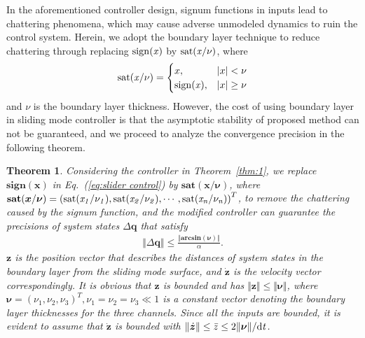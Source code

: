 \documentclass[3p]{elsarticle}
\theoremstyle{plain}
\newtheorem{mythm}{Theorem}
\theoremstyle{remark}
\begin{document}
In the aforementioned controller design, signum functions in inputs lead to chattering phenomena, which may cause adverse unmodeled dynamics to ruin the control system. Herein, we adopt the boundary layer technique to reduce chattering through replacing $\rm{sign}\it{(x)}$ by $\rm{sat}\it{(x/\nu)}$, where
\begin{align}
\rm{sat}\it{(x/\nu)}=
\begin{cases}
x,&\vert x\vert <\nu\\
\rm{sign}\it{(x)},&\vert x\vert\ge\nu
\end{cases}
\end{align}
and $\nu$ is the boundary layer thickness. However, the cost of using boundary layer in sliding mode controller is that the asymptotic stability of proposed method can not be guaranteed, and we proceed to analyze the convergence precision in the following theorem.
\begin{mythm}
Considering the controller in Theorem~\ref{thm:1}, we replace $\mathbf{sign}{(\bm{x})}$ in Eq.~(\ref{eq:slider control}) by $\mathbf{sat}{(\boldsymbol {x/\nu})}$, where $\mathbf{sat}{(\boldsymbol{x}/\boldsymbol{\nu})}=\left(\rm{sat}\it{(x_1/\nu_1)},\rm{sat}\it{(x_2/\nu_2)},\cdots,\rm{sat}\it{(x_n/\nu_n)}\right)^T$, to remove the chattering caused by the signum function, and the modified controller can guarantee the precisions of system states $\Delta\bm q$ that satisfy
\begin{align}
  \Vert\Delta\bm q\Vert\le\frac{\Vert\boldsymbol{arcsin}(\bm \nu)\Vert}{\alpha}.
\end{align}
$\bm z$ is the position vector that describes the distances of system states in the boundary layer from the sliding mode surface, and $\dot{\bm z}$ is the velocity vector correspondingly. It is obvious that $\bm z$ is bounded and has $\Vert\bm z\Vert\le\Vert\bm\nu\Vert$, where $\bm\nu=(\nu_1,\nu_2,\nu_3)^T,\nu_1=\nu_2=\nu_3\ll 1$ is a constant vector denoting the boundary layer thicknesses for the three channels. Since all the inputs are bounded, it is evident to assume that $\dot{\bm z}$ is bounded with $\Vert\dot{\bm z}\Vert\le \bar z\le 2\Vert\bm\nu\Vert/\rm{d}\it{t}$.
\end{mythm}
\end{document}
